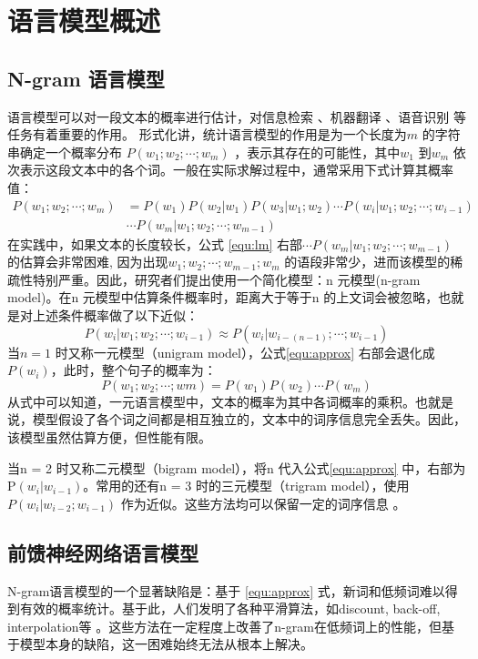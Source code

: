 \documentclass[12pt,a4paper]{article}
\begin{document}
\section{语言模型概述}

\subsection{N-gram 语言模型}
语言模型可以对一段文本的概率进行估计，对信息检索 \cite{Jin:2002:TLM:564376.564386}、机器翻译 \cite{DBLP:conf/naacl/BaltescuB15}、语音识别 \cite{DBLP:conf/interspeech/SakSB14}等任务有着重要的作用。
形式化讲，统计语言模型的作用是为一个长度为$m$ 的字符串确定一个概率分布 $P(w_1;w_2;\cdots;w_m)$ ，表示其存在的可能性，其中$w_1$ 到$w_m$ 依次表示这段文本中的各个词。一般在实际求解过程中，通常采用下式计算其概率值：
\begin{equation}
\label{equ:lm}
\begin{split}
P(w_1;w_2; \cdots;w_m) &= P(w_1) P(w_2|w_1) P(w_3|w_1;w_2)\cdots P(w_i | w_1;w_2;\cdots;w_{i-1}) \\
&\cdots P(w_m | w_1;w_2;\cdots;w_{m-1})
\end{split}
\end{equation}
在实践中，如果文本的长度较长，公式 \ref{equ:lm} 右部$\cdots P(w_m | w_1;w_2;\cdots;w_{m-1}) $  的估算会非常困难, 因为出现$w_1;w_2;\cdots;w_{m-1};w_{m}$ 的语段非常少，进而该模型的稀疏性特别严重。因此，研究者们提出使用一个简化模型：n 元模型(n-gram model)。在n 元模型中估算条件概率时，距离大于等于n 的上文词会被忽略，也就是对上述条件概率做了以下近似：
\begin{equation}
\label{equ:approx}
P(w_i | w_1;w_2;\cdots;w_{i-1})  \approx P(w_i | w_{i-(n-1)};\cdots;w_{i-1})
\end{equation}
当$n = 1$ 时又称一元模型（unigram model），公式\ref{equ:approx} 右部会退化成$P(w_i)$，此时，整个句子的概率为：
\begin{equation}
P(w_1;w_2; \cdots;wm) = P(w_1)P(w_2) \cdots P(w_m)
\end{equation}
从式中可以知道，一元语言模型中，文本的概率为其中各词概率的乘积。也就是说，模型假设了各个词之间都是相互独立的，文本中的词序信息完全丢失。因此，该模型虽然估算方便，但性能有限。

当n = 2 时又称二元模型（bigram model），将n 代入公式\ref{equ:approx} 中，右部为P$(w_i|w_{i-1})$。常用的还有n = 3 时的三元模型（trigram model），使用$P(w_i |w_{i-2};w_{i-1})$ 作为近似。这些方法均可以保留一定的词序信息 \cite{DBLP:journals/csl/ChenG99}。

\subsection{前馈神经网络语言模型}
N-gram语言模型的一个显著缺陷是：基于 \ref{equ:approx} 式，新词和低频词难以得到有效的概率统计。基于此，人们发明了各种平滑算法，如discount, back-off, interpolation等 \cite{DBLP:conf/interspeech/2009,DBLP:journals/csl/ZhouL99}。这些方法在一定程度上改善了n-gram在低频词上的性能，但基于模型本身的缺陷，这一困难始终无法从根本上解决。
\end{document}
